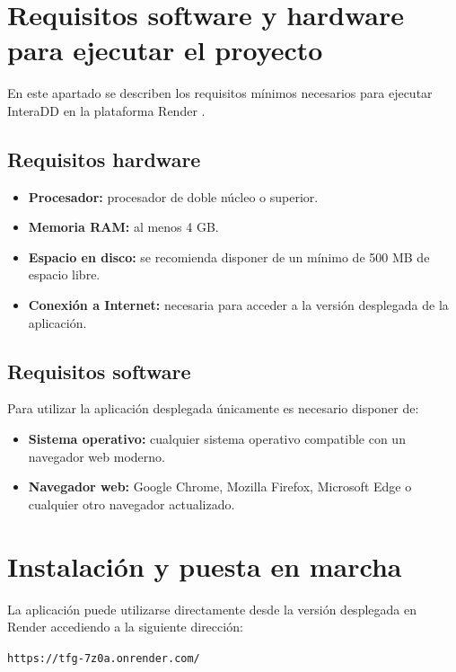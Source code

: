 
\section{Requisitos software y hardware para ejecutar el proyecto}

En este apartado se describen los requisitos mínimos necesarios para ejecutar InteraDD en la plataforma Render \cite{render}.

\subsection*{Requisitos hardware}

\begin{itemize}
    \item \textbf{Procesador:} procesador de doble núcleo o superior.
    \item \textbf{Memoria RAM:} al menos 4 GB.
    \item \textbf{Espacio en disco:} se recomienda disponer de un mínimo de 500 MB de espacio libre.
    \item \textbf{Conexión a Internet:} necesaria para acceder a la versión desplegada de la aplicación.
\end{itemize}

\subsection*{Requisitos software}

Para utilizar la aplicación desplegada únicamente es necesario disponer de:

\begin{itemize}
    \item \textbf{Sistema operativo:} cualquier sistema operativo compatible con un navegador web moderno.
    \item \textbf{Navegador web:} Google Chrome, Mozilla Firefox, Microsoft Edge o cualquier otro navegador actualizado.
\end{itemize}

\section{Instalación y puesta en marcha}

La aplicación puede utilizarse directamente desde la versión desplegada en Render accediendo a la siguiente dirección:

\begin{center}
\texttt{https://tfg-7z0a.onrender.com/}
\end{center}

